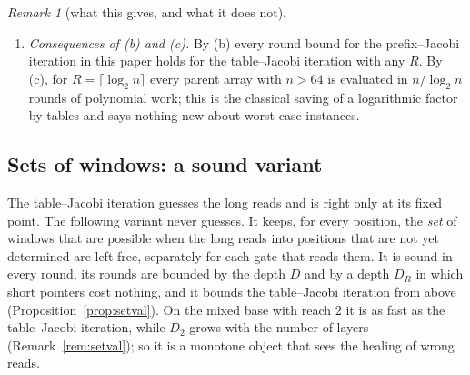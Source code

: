 \documentclass[11pt]{amsart}
\theoremstyle{definition}
\theoremstyle{remark}
\newtheorem{remark}[theorem]{Remark}
\newcommand{\eps}{\varepsilon}
\begin{document}
\begin{remark}[what this gives, and what it does not]
\begin{enumerate}[label=(\roman*),leftmargin=2.4em]
$\mathrm P\subseteq\mathrm{BPNC}$. The bases of these proofs have listed pointers of every length,
so Theorem~\ref{thm:table}(d) does not apply to them. For bases of reach $O(\log n)$, such as the
random block bases of Section~\ref{sec:block}, no hardness is known, and we found no algorithm of
polylogarithmic parallel time. On block bases the obstacle, as far as we understand it, has two
parts, neither of which is proved: below the levels of Section~\ref{sec:block} the blocks do not
seem to forget wrong inputs, and the resampled pointers form stacked chains of length of order
$\sqrt{\eps n}$, which is how far the argument for (d) goes. The iteration is faster than that
chain by a constant factor in the simulations and shows the same growth at noise $0.15$. By a
rough estimate, keeping in the state the $O(\log n)$ long reads just above the correct part,
instead of iterating over them, would save a factor of order $\sqrt{\log n}$ only. So
Section~\ref{sec:table} shows only that the lower bound $n/\log n$ for the iterations of Section~\ref{sec:iterations} is
not a lower bound for parallel time on these bases.
\item \emph{Consequences of (b) and (c).} By (b) every round bound for the prefix--Jacobi iteration
in this paper holds for the table--Jacobi iteration with any $R$. By (c), for
$R=\lceil\log_2n\rceil$ every parent array with $n>64$ is evaluated in $n/\log_2n$ rounds of polynomial work;
this is the classical saving of a logarithmic factor by tables and says nothing new about
worst-case instances.
\end{enumerate}
\end{remark}

\subsection{Sets of windows: a sound variant}\label{sec:setval}

The table--Jacobi iteration guesses the long reads and is right only at its fixed point. The
following variant never guesses. It keeps, for every position, the \emph{set} of windows that are
possible when the long reads into positions that are not yet determined are left free,
separately for each gate that reads them. It is sound in every round, its rounds are bounded by
the depth $D$ and by a depth $D_R$ in which short pointers cost nothing, and it bounds the
table--Jacobi iteration from above (Proposition~\ref{prop:setval}). On the mixed base with reach
$2$ it is as fast as the table--Jacobi iteration, while $D_2$ grows with the number of layers
(Remark~\ref{rem:setval}); so it is a monotone object that sees the healing of wrong reads.
\end{document}
